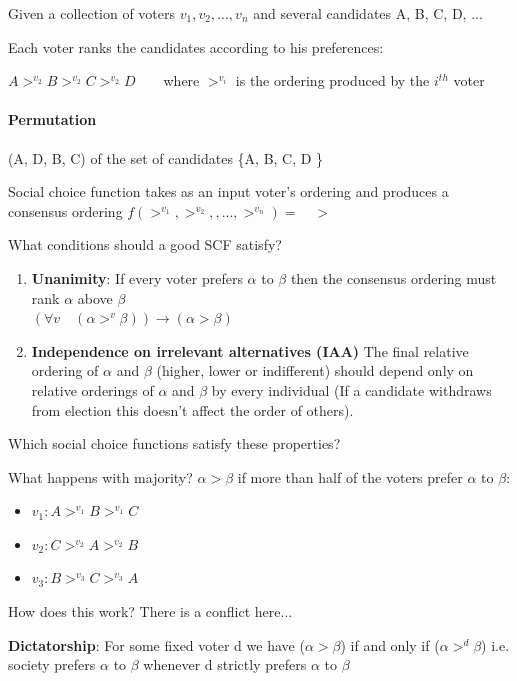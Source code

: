 \documentclass[9pt, letterpaper, oneside]{article}
\begin{document}
Given a collection of voters $v_1, v_2, ..., v_n$ and several candidates A, B, C, D, ...

Each voter ranks the candidates according to his preferences:

$A >^{v_2} B >^{v_2} C >^{v_2} D \qquad $where $>^{v_i} $ is the ordering produced by the $i^{th}$ voter

\paragraph{Permutation}

(A, D, B, C) of the set of candidates \{A, B, C, D \}

Social choice function takes as an input voter's ordering and produces a consensus ordering $f(>^{v_1},>^{v_2},,...,>^{v_n}) = \quad >$

What conditions should a good SCF satisfy?
\begin{enumerate}
	\item \textbf{Unanimity}: If every voter prefers $\alpha$ to $\beta$ then the consensus ordering must rank $\alpha$ above $\beta$ \\
	$(\forall v \quad (\alpha >^{v} \beta)) \to (\alpha > \beta)$
	\item \textbf{Independence on irrelevant alternatives (IAA)}
	The final relative ordering of $\alpha$ and $\beta$ (higher, lower or indifferent) should depend only on relative orderings of $\alpha$ and $\beta$ by every individual (If a candidate withdraws from election this doesn't affect the order of others). 
\end{enumerate}

Which social choice functions satisfy these properties?

What happens with majority? $\alpha > \beta$ if more than half of the voters prefer $\alpha$ to $\beta$:
\begin{itemize}
	\item $v_1 : A >^{v_1} B >^{v_1} C $
	\item $v_2 : C >^{v_2} A >^{v_2} B $
	\item $v_3 : B >^{v_3} C >^{v_3} A $
\end{itemize}

How does this work? There is a conflict here...

\textbf{Dictatorship}: For some fixed voter d we have ($\alpha > \beta$) if and only if ($\alpha >^d \beta$) i.e. society prefers $\alpha$ to $\beta$ whenever d strictly prefers $\alpha$ to $\beta$
\end{document}
